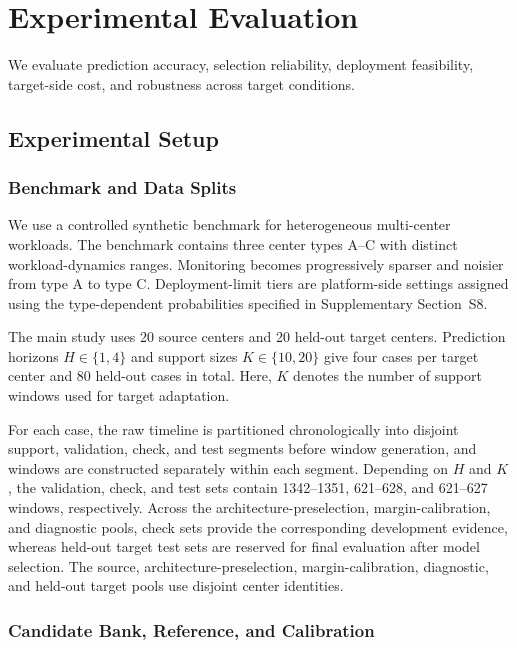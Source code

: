 \documentclass[a4paper,fleqn]{cas-sc}
\begin{document}
\section{Experimental Evaluation}
\label{sec:experiments}

We evaluate prediction accuracy, selection reliability, deployment
feasibility, target-side cost, and robustness across target conditions.

\subsection{Experimental Setup}
\label{subsec:experimental-setup}

\subsubsection{Benchmark and Data Splits}

We use a controlled synthetic benchmark for heterogeneous multi-center
workloads. The benchmark contains three center types A--C with distinct
workload-dynamics ranges. Monitoring becomes progressively sparser and noisier
from type A to type C. Deployment-limit tiers are platform-side settings
assigned using the type-dependent probabilities specified in Supplementary
Section~S8.

The main study uses 20 source centers and 20 held-out target centers.
Prediction horizons $H\in\{1,4\}$ and support sizes $K\in\{10,20\}$ give
four cases per target center and 80 held-out cases in total. Here, $K$
denotes the number of support windows used for target adaptation.

For each case, the raw timeline is partitioned chronologically into disjoint
support, validation, check, and test segments before window generation, and
windows are constructed separately within each segment. Depending on $H$ and
$K$, the validation, check, and test sets contain 1342--1351, 621--628, and
621--627 windows, respectively. Across the architecture-preselection, margin-calibration, and diagnostic pools,
check sets provide the corresponding development evidence, whereas held-out
target test sets are reserved for final evaluation after model selection. The source, architecture-preselection,
margin-calibration, diagnostic, and held-out target pools use disjoint center
identities.

\subsubsection{Candidate Bank, Reference, and Calibration}
\label{subsubsec:bank-calibration}
\end{document}
